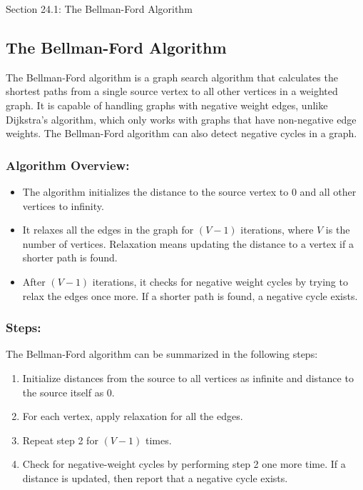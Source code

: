 \begin{notes}{Section 24.1: The Bellman-Ford Algorithm}
    \subsection*{The Bellman-Ford Algorithm}

    The Bellman-Ford algorithm is a graph search algorithm that calculates the shortest paths from a single source vertex to all other vertices in a weighted graph. It is capable of handling graphs 
    with negative weight edges, unlike Dijkstra's algorithm, which only works with graphs that have non-negative edge weights. The Bellman-Ford algorithm can also detect negative cycles in a graph. \vspace*{1em}
    
    \subsubsection*{Algorithm Overview:}
    
    \begin{itemize}
        \item The algorithm initializes the distance to the source vertex to 0 and all other vertices to infinity.
        \item It relaxes all the edges in the graph for $(V - 1)$ iterations, where $V$ is the number of vertices. Relaxation means updating the distance to a vertex if a shorter path is found.
        \item After $(V - 1)$ iterations, it checks for negative weight cycles by trying to relax the edges once more. If a shorter path is found, a negative cycle exists.
    \end{itemize}
    
    \subsubsection*{Steps:}
    
    The Bellman-Ford algorithm can be summarized in the following steps:
    \begin{enumerate}
        \item Initialize distances from the source to all vertices as infinite and distance to the source itself as 0.
        \item For each vertex, apply relaxation for all the edges.
        \item Repeat step 2 for $(V - 1)$ times.
        \item Check for negative-weight cycles by performing step 2 one more time. If a distance is updated, then report that a negative cycle exists.
    \end{enumerate}
    

\end{notes}
